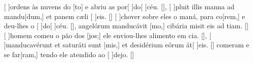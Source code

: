 {    {[ ]{or}dens às nuvens do [to] e abriu as por[ ]{do}[ ]{céu}. [\LinkPT]},
  {[ ]{plu}it illis manna ad mandu[dum,] et panem cæli [ ]{e}is. [\LinkLA]}%
    {[ ]{cho}ver sobre eles o maná, para co[rem,] e deu-lhes o [ ]{do}[ ]{céu}. [\LinkPT]},
  { angelórum manducávit [mo,] cibária misit eis ad tiam. [\LinkLA]}%
    {[ ]{ho}mem comeu o pão dos [jos;] ele enviou-lhes alimento em cia. [\LinkPT]},
  {[ ]{man}ducavérunt et saturáti sunt [mis,] et desidérium eórum át[ ]{e}is. [\LinkLA]}%
    { comeram e se far[ram,] tendo ele atendido ao [ ]{de}jo. [\LinkPT]}
}